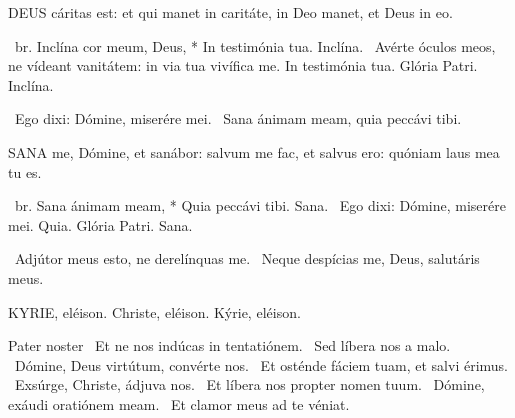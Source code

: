 



\lettrine[lines=2]{D}{EUS} cáritas est: et qui manet in caritáte, in Deo manet, et Deus in eo.

\R\ br. Inclína cor meum, Deus, * In testimónia tua. Inclína. \V\ Avérte óculos meos, ne vídeant vanitátem: in via tua vivífica me. In testimónia tua. Glória Patri. Inclína.

\V\ Ego dixi: Dómine, miserére mei. \R\ Sana ánimam meam, quia peccávi tibi.




\lettrine[lines=2]{S}{ANA} me, Dómine, et sanábor: salvum me fac, et salvus ero: quóniam laus mea tu es.

\R\ br. Sana ánimam meam, * Quia peccávi tibi. Sana. \V\ Ego dixi: Dómine, miserére mei. Quia. Glória Patri. Sana.

\V\ Adjútor meus esto, ne derelínquas me. \R\ Neque despícias me, Deus, salutáris meus.



KYRIE, eléison. Christe, eléison. Kýrie, eléison.

Pater noster  \V\ Et ne nos indúcas in tentatiónem. \R\ Sed líbera nos a malo. \V\ Dómine, Deus virtútum, convérte nos. \R\ Et osténde fáciem tuam, et salvi érimus. \V\ Exsúrge, Christe, ádjuva nos. \R\ Et líbera nos propter nomen tuum. \V\ Dómine, exáudi oratiónem meam. \R\ Et clamor meus ad te véniat.


